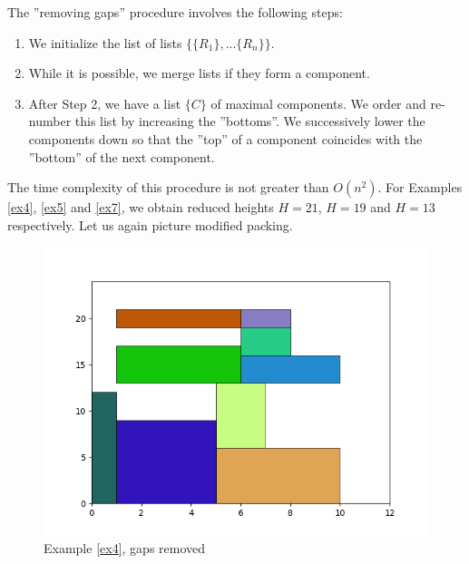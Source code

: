 \documentclass{article}
\theoremstyle{definition}
\theoremstyle{theorem}
\numberwithin{proposition}{section}
\begin{document}
        The ''removing gaps'' procedure involves the following steps:
        \begin{enumerate}
            \item
                We initialize the list of lists $\{\{R_1\}, . . . \{R_n\}\}$.
            \item
                While it is possible, we merge lists if they form a component.
            \item
                After Step 2, we have a list $\{C\}$ of maximal components. We order and re-number this list by increasing the ''bottoms''. We successively lower the components down so that the ''top'' of a component coincides with the ''bottom'' of the next component.
        \end{enumerate}
        The time complexity of this procedure is not greater than $O(n^2)$. For Examples \ref{ex4}, \ref{ex5} and \ref{ex7}, we obtain reduced heights $H = 21$, $H = 19$ and $H = 13$ respectively. Let us again picture modified packing.
        \begin{figure}[H]
            \centering
            \includegraphics[scale=0.5]{../examples/no-gaps-4.png}
            \caption{Example \ref{ex4}, gaps removed}
        \end{figure}
\end{document}
